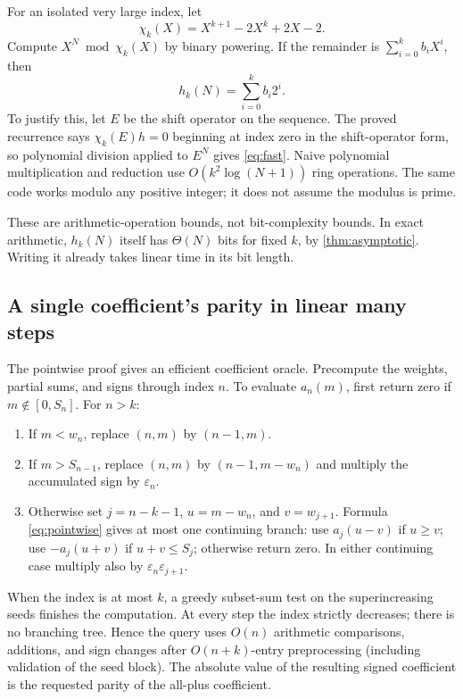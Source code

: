 \documentclass[11pt]{article}
\numberwithin{equation}{section}
\theoremstyle{definition}
\theoremstyle{remark}
\newcommand{\eps}{\varepsilon}
\begin{document}
For an isolated very large index, let
\[
 \chi_k(X)=X^{k+1}-2X^k+2X-2.
\]
Compute $X^N\bmod\chi_k(X)$ by binary powering. If the remainder is
$\sum_{i=0}^k b_iX^i$, then
\begin{equation}\label{eq:fast}
 h_k(N)=\sum_{i=0}^k b_i2^i.
\end{equation}
To justify this, let $E$ be the shift operator on the sequence. The proved
recurrence says $\chi_k(E)h=0$ beginning at index zero in the shift-operator
form, so polynomial division applied to $E^N$ gives \eqref{eq:fast}.
Naive polynomial multiplication and reduction use
$O(k^2\log(N+1))$ ring operations. The same code works modulo any
positive integer; it does not assume the modulus is prime.

These are arithmetic-operation bounds, not bit-complexity bounds. In exact
arithmetic, $h_k(N)$ itself has $\Theta(N)$ bits for fixed $k$, by
\cref{thm:asymptotic}. Writing it already takes linear time in its bit length.

\subsection{A single coefficient's parity in linear many steps}
The pointwise proof gives an efficient coefficient oracle. Precompute the
weights, partial sums, and signs through index $n$. To evaluate $a_n(m)$,
first return zero if $m\notin[0,S_n]$. For $n>k$:
\begin{enumerate}[label=(\arabic*)]
\item If $m<w_n$, replace $(n,m)$ by $(n-1,m)$.
\item If $m>S_{n-1}$, replace $(n,m)$ by $(n-1,m-w_n)$ and multiply the
      accumulated sign by $\eps_n$.
\item Otherwise set $j=n-k-1$, $u=m-w_n$, and $v=w_{j+1}$.
      Formula \eqref{eq:pointwise} gives at most one continuing branch:
      use $a_j(u-v)$ if $u\ge v$; use $-a_j(u+v)$ if
      $u+v\le S_j$; otherwise return zero. In either continuing case
      multiply also by $\eps_n\eps_{j+1}$.
\end{enumerate}
When the index is at most $k$, a greedy subset-sum test on the
superincreasing seeds finishes the computation. At every step the index
strictly decreases; there is no branching tree. Hence the query uses
$O(n)$ arithmetic comparisons, additions, and sign changes after
$O(n+k)$-entry preprocessing (including validation of the seed block). The absolute value of the resulting signed
coefficient is the requested parity of the all-plus coefficient.
\end{document}
